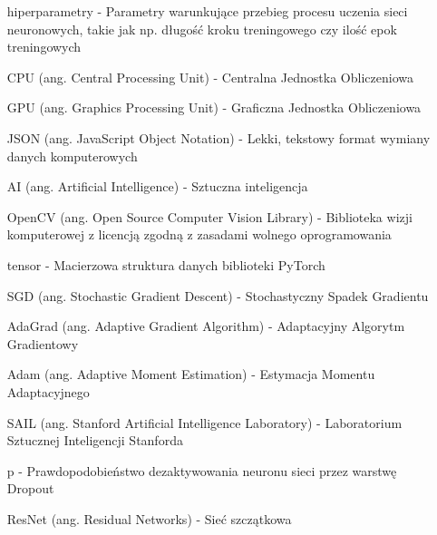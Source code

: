\begin{itemize}
    \item[hiperparametry] - Parametry warunkujące przebieg procesu uczenia sieci neuronowych,
    takie jak np. długość kroku treningowego czy ilość epok treningowych
    \item[CPU] (ang. Central Processing Unit) - Centralna Jednostka Obliczeniowa
    \item[GPU] (ang. Graphics Processing Unit) - Graficzna Jednostka Obliczeniowa
    \item[JSON] (ang. JavaScript Object Notation) - Lekki, tekstowy format wymiany danych komputerowych
    \item[AI] (ang. Artificial Intelligence) - Sztuczna inteligencja
    \item[OpenCV] (ang. Open Source Computer Vision Library) - Biblioteka wizji komputerowej z licencją zgodną z zasadami wolnego oprogramowania
    \item[tensor] - Macierzowa struktura danych biblioteki PyTorch
    \item[SGD] (ang. Stochastic Gradient Descent) - Stochastyczny Spadek Gradientu
    \item[AdaGrad] (ang. Adaptive Gradient Algorithm) - Adaptacyjny Algorytm Gradientowy
    \item[Adam] (ang. Adaptive Moment Estimation) - Estymacja Momentu Adaptacyjnego
    \item[SAIL] (ang. Stanford Artificial Intelligence Laboratory) - Laboratorium Sztucznej Inteligencji Stanforda
    \item[p] - Prawdopodobieństwo dezaktywowania neuronu sieci przez warstwę Dropout
    \item[ResNet] (ang. Residual Networks) - Sieć szczątkowa

  \end{itemize}
